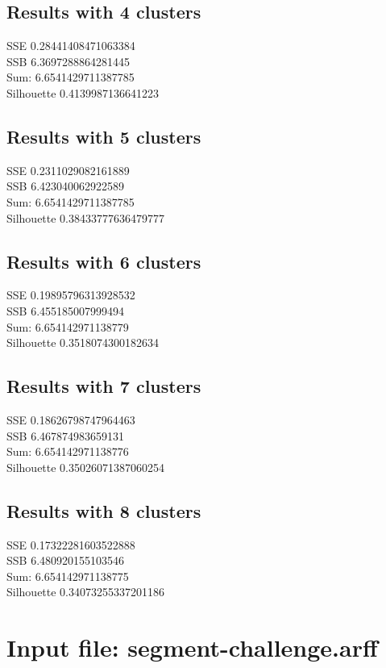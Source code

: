 \documentclass[11pt,a4paper]{article}
\begin{document}
\subsection{Results with 4 clusters}
SSE 0.28441408471063384 \\
SSB 6.3697288864281445 \\
Sum: 6.6541429711387785 \\
Silhouette 0.4139987136641223 \\

\subsection{Results with 5 clusters}
SSE 0.2311029082161889 \\
SSB 6.423040062922589 \\
Sum: 6.6541429711387785 \\
Silhouette 0.38433777636479777 \\

\subsection{Results with 6 clusters}
SSE 0.19895796313928532 \\
SSB 6.455185007999494 \\
Sum: 6.654142971138779 \\
Silhouette 0.3518074300182634 \\

\subsection{Results with 7 clusters}
SSE 0.18626798747964463 \\
SSB 6.467874983659131 \\
Sum: 6.654142971138776 \\
Silhouette 0.35026071387060254 \\

\subsection{Results with 8 clusters}
SSE 0.17322281603522888 \\
SSB 6.480920155103546 \\
Sum: 6.654142971138775 \\
Silhouette 0.34073255337201186 \\

\section{Input file: segment-challenge.arff}
\end{document}
